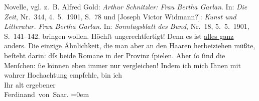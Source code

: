 \begin{ledgroupsized}[t]{13cm}
{{{                  Novelle, vgl. z. B. Alfred Gold: \emph{Arthur Schnitzler: Frau Bertha Garlan}. In: \emph{Die Zeit}, Nr. 344, 4. 5. 1901,
                     S. 78 und [Joseph Victor
                        Widmann?]: \emph{Kunst und Litteratur. Frau
                        Bertha Garlan}. In: \emph{Sonntagsblatt des
                        Bund}, Nr. 18, 5. 5. 1901, S. 141–142.}}}\label{K_L01130-1h}
               bringen wollen. Höchſt ungerechtfertigt! Denn es ist \uline{alles
                  ganz} anders. Die einzige Ähnlichkeit, die man aber an den Haaren herbeiziehen
               müßte, beſteht darin: dſs beide Romane in der Provinz ſpielen. Aber ſo ſind die
               Menſchen: ſie können eben immer nur vergleichen! \pend
           \pstart
           Indem ich mich Ihnen mit wahrer Hochachtung empfehle, bin ich{\\[\baselineskip]}Ihr alt ergebener{\\[\baselineskip]}\spacefill\mbox{Ferdinand von Saar.}\pend
           \leftskip=0em{}
         
         \endnumbering{}\end{ledgroupsized}  \newcommand{\dateiname}{L01130}\newcommand{\titel}{Ferdinand von Saar an Arthur Schnitzler, 19. 6. 1901}\newcommand{\editorInnen}{Martin Anton Müller und Gerd-Hermann Susen}
      